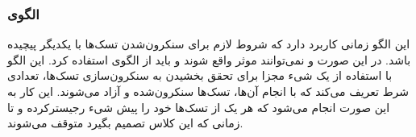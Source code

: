 \subsubsection{الگوی }
\label{scheduleRendezvousSec}
\begin{RTL}
این الگو زمانی کاربرد دارد که شروط لازم برای سنکرون‌شدن تسک‌ها با یکدیگر پیچیده باشد.
در این صورت  و
 نمی‌توانند موثر واقع شوند و باید از
الگوی  استفاده کرد.
این الگو با استفاده از یک شیء مجزا برای تحقق بخشیدن به سنکرون‌سازی تسک‌ها،
تعدادی شرط تعریف می‌کند که با انجام آن‌ها، تسک‌ها سنکرون‌شده و آزاد می‌شوند.
این کار به این صورت انجام می‌شود که هر یک از تسک‌ها خود را پیش شیء
 رجیسترکرده و تا زمانی که این کلاس تصمیم بگیرد
متوقف می‌شوند.
\end{RTL}